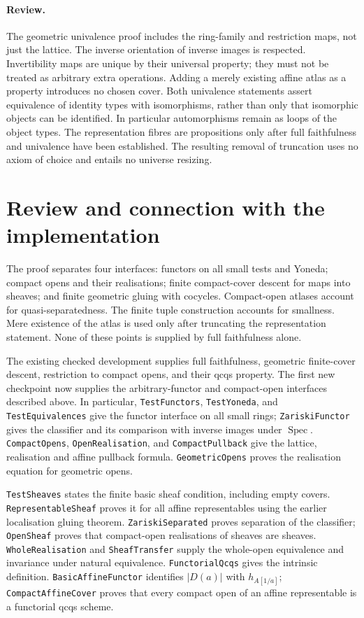 \documentclass[11pt]{amsart}
\theoremstyle{definition}\newtheorem{definition}[theorem]{Definition}
\theoremstyle{remark}\newtheorem{remark}[theorem]{Remark}
\newcommand{\Spec}{\operatorname{Spec}}
\begin{document}
\paragraph{Review.}
The geometric univalence proof includes the ring-family and restriction
maps, not just the lattice. The inverse orientation of inverse images
is respected. Invertibility maps are unique by their universal property;
they must not be treated as arbitrary extra operations. Adding a merely
existing affine atlas as a property introduces no chosen cover.
Both univalence statements assert equivalence of identity types with
isomorphisms, rather than only that isomorphic objects can be identified.
In particular automorphisms remain as loops of the object types.
The representation fibres are propositions only after full faithfulness
and univalence have been established. The resulting removal of
truncation uses no axiom of choice and entails no universe resizing.

\section{Review and connection with the implementation}
The proof separates four interfaces: functors on all small tests and
Yoneda; compact opens and their realisations; finite compact-cover
descent for maps into sheaves; and finite geometric gluing with cocycles.
Compact-open atlases account for quasi-separatedness. The finite tuple
construction accounts for smallness. Mere existence of the atlas is
used only after truncating the representation statement. None of these
points is supplied by full faithfulness alone.

\begingroup\raggedright
The existing checked development supplies full faithfulness, geometric
finite-cover descent, restriction to compact opens, and their qcqs
property. The first new checkpoint now supplies the arbitrary-functor
and compact-open interfaces described above. In particular,
\texttt{TestFunctors}, \texttt{TestYoneda}, and \texttt{TestEquivalences}
give the functor interface on all small rings; \texttt{ZariskiFunctor}
gives the classifier and its comparison with inverse images under
$\Spec$. \texttt{CompactOpens}, \texttt{OpenRealisation}, and
\texttt{CompactPullback} give the lattice, realisation and affine
pullback formula. \texttt{GeometricOpens} proves the realisation equation
for geometric opens.

\texttt{TestSheaves} states the finite basic sheaf condition, including
empty covers. \texttt{RepresentableSheaf} proves it for all affine
representables using the earlier localisation gluing theorem.
\texttt{ZariskiSeparated} proves separation of the classifier;
\texttt{OpenSheaf} proves that compact-open realisations of sheaves are
sheaves. \texttt{WholeRealisation} and \texttt{SheafTransfer} supply the
whole-open equivalence and invariance under natural equivalence.
\texttt{FunctorialQcqs} gives the intrinsic definition.
\texttt{BasicAffineFunctor} identifies $|D(a)|$ with $h_{A[1/a]}$;
\texttt{CompactAffineCover} proves that every compact open of an affine
representable is a functorial qcqs scheme.
\end{document}
